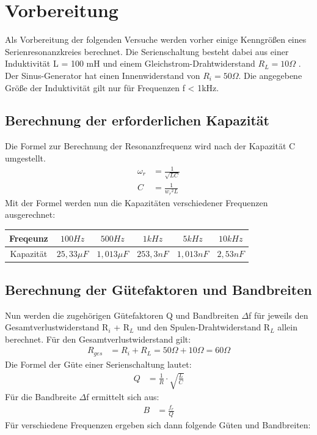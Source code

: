 \documentclass{article}
\begin{document}
\newpage
\thispagestyle{empty}

\tableofcontents


\newpage


\section{Vorbereitung}
Als Vorbereitung der folgenden Versuche werden vorher einige Kenngrößen eines Serienresonanzkreies berechnet.
Die Serienschaltung besteht dabei aus einer Induktivität L = 100 mH und einem Gleichstrom-Drahtwiderstand $R_L = 10 \Omega$ . Der Sinus-Generator
hat einen Innenwiderstand von $R_i = 50\Omega$. Die angegebene Größe der Induktivität gilt nur für Frequenzen f < 1kHz.

\subsection{Berechnung der erforderlichen Kapazität}
Die Formel zur Berechnung der Resonanzfrequenz wird nach der Kapazität C umgestellt.
\begin{align*}
  \omega_r &= \frac{1}{\sqrt{LC}}\\
  C &= \frac{1}{{w_r}^2L}
\end{align*}
Mit der Formel werden nun die Kapazitäten verschiedener Frequenzen ausgerechnet:
\begin{center}

  \begin{tabular}{|c|c|c|c|c|c|}    
    \hline
    Freqeunz               & $100 Hz$                   & $500Hz$                   & $1kHz$            & $5kHz$          & $10kHz$              \\
    \hline
    Kapazität              & $25,33\mu F$                      & $1,013\mu F$                     & $253,3nF$            & $1,013nF$           & $2,53nF$              \\
    \hline
  \end{tabular}

\end{center}

\subsection{Berechnung der Gütefaktoren und Bandbreiten}
Nun werden die zugehörigen Gütefaktoren Q und Bandbreiten $\Delta$f für jeweils den Gesamtverlustwiderstand R$_i$ + R$_L$ und den Spulen-Drahtwiderstand R$_L$ allein berechnet.
Für den Gesamtverlustwiderstand gilt:
\begin{align*}
  R_{ges} &= R_i + R_L= 50\Omega + 10\Omega = 60\Omega
\end{align*}
Die Formel der Güte einer Serienschaltung lautet:
\begin{align*}
  Q &= \frac{1}{R}\cdot\sqrt{\frac{L}{C}}
\end{align*}
Für die Bandbreite $\Delta$f ermittelt sich aus:
\begin{align*}
  B &= \frac{f_r}{Q}
\end{align*}
Für verschiedene Frequenzen ergeben sich dann folgende Güten und Bandbreiten:
\end{document}
